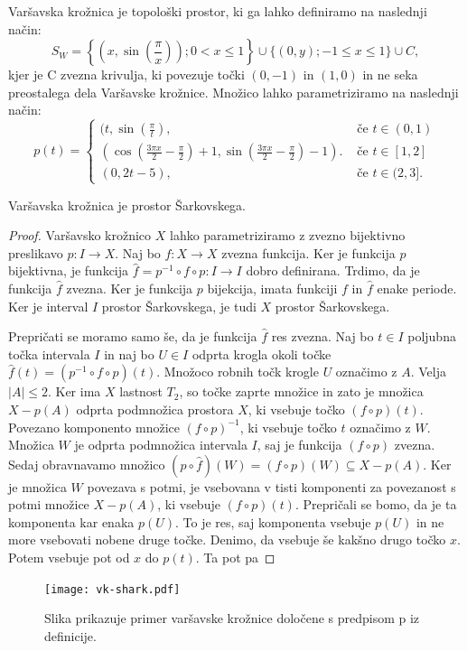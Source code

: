 \documentclass[../TG_magistrsko_delo_sections.tex]{subfiles}
\begin{document}
\begin{definicija}\label{def:vk}
Varšavska krožnica je topološki prostor, ki ga lahko definiramo na naslednji način:
$$S_W = \left\{\left(x, \sin\left(\frac{\pi}{x}\right)\right); 0 < x \leq 1\right\} \cup \{(0, y); -1 \leq x \leq 1\} \cup C,$$
kjer je C zvezna krivulja, ki povezuje točki $(0,-1)$ in $(1,0)$ in ne seka preostalega dela Varšavske krožnice.
Množico lahko parametriziramo na naslednji način:
\[ p(t) = \begin{cases}
  (t, \sin(\frac{\pi}{t}), & \mbox{ če $t \in (0, 1) $}\\
 (\cos(\frac{3\pi x}{2}-\frac{\pi}{2})+1, \sin(\frac{3\pi x}{2}-\frac{\pi}{2})-1). & \mbox{ če $t \in [1, 2]$}\\
  (0, 2t-5), & \mbox{ če $t \in (2, 3]$.}
  \end{cases}
  \]
\end{definicija}

\begin{trditev}
Varšavska krožnica je prostor Šarkovskega.
\end{trditev}


\begin{proof}
Varšavsko krožnico $X$ lahko parametriziramo z zvezno bijektivno preslikavo $p:I \to X$. Naj bo $f: X \to X$ zvezna funkcija. Ker je funkcija $p$ bijektivna, je funkcija $\widehat{f} = p^{-1} \circ f \circ p : I \to I$ dobro definirana. Trdimo, da je funkcija $\widehat{f}$ zvezna. Ker je funkcija $p$ bijekcija, imata funkciji $f$ in $\widehat{f}$ enake periode. Ker je interval $I$ prostor Šarkovskega, je tudi $X$ prostor Šarkovskega. 

Prepričati se moramo samo še, da je funkcija $\widehat{f}$ res zvezna. Naj bo $t \in I$ poljubna točka intervala $I$ in naj bo $U \in I$ odprta krogla okoli točke $\widehat{f}(t) = (p^{-1} \circ f \circ p)(t)$. Množoco robnih točk krogle $U$ označimo z $A$. Velja $|A| \leq 2$. Ker ima $X$ lastnost $T_2$, so točke zaprte množice in zato je množica $X - p(A)$ odprta podmnožica prostora $X$, ki vsebuje točko $(f \circ p)(t)$. Povezano komponento množice $(f \circ p)^{-1}$, ki vsebuje točko $t$ označimo z $W$. Množica $W$ je odprta podmnožica intervala $I$, saj je funkcija $(f \circ p)$ zvezna. Sedaj obravnavamo množico $\left(p \circ \widehat{f}\right) (W) = (f \circ p)(W) \subseteq X - p(A)$. Ker je množica $W$ povezava s potmi, je vsebovana v tisti komponenti za povezanost s potmi množice $X-p(A)$, ki vsebuje $(f \circ p)(t)$. 
Prepričali se bomo, da je ta komponenta kar enaka $p(U)$. To je res, saj komponenta vsebuje $p(U)$ in ne more vsebovati nobene druge točke. Denimo, da vsebuje še kakšno drugo točko $x$. Potem vsebuje pot od $x$ do $p(t)$. Ta pot pa  
\end{proof}

\begin{figure}[h]
  \centering
  \texttt{[image: vk-shark.pdf]}
  \caption[Varšavska krožnica]{Slika prikazuje primer varšavske krožnice določene s predpisom p iz definicije.}
  \label{fig:varšavski}
\end{figure}
\end{document}
